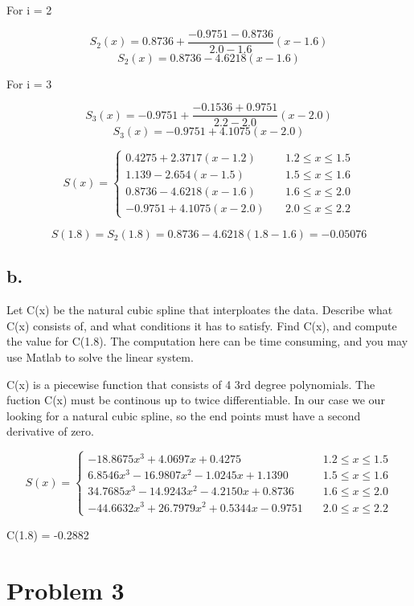 \documentclass[]{article}
\begin{document}
For i = 2

\[S_2(x) = 0.8736 + \frac{-0.9751 - 0.8736}{2.0-1.6}(x-1.6)\]
\[S_2(x) = 0.8736 - 4.6218(x-1.6)\]

For i = 3

\[S_3(x) = -0.9751 + \frac{-0.1536 + 0.9751}{2.2-2.0}(x-2.0)\]
\[S_3(x) = -0.9751 + 4.1075(x-2.0)\]

\[
S(x) = \left\{
        \begin{array}{ll}
            0.4275 + 2.3717(x-1.2) & \quad 1.2 \leq x \leq 1.5 \\
            1.139 - 2.654(x-1.5) & \quad 1.5 \leq x \leq 1.6 \\
            0.8736 - 4.6218(x-1.6) & \quad 1.6 \leq x \leq 2.0\\
            -0.9751 + 4.1075(x-2.0) & \quad 2.0 \leq x \leq 2.2
        \end{array}
    \right.
\]

\[S(1.8) = S_2(1.8) = 0.8736 - 4.6218(1.8 - 1.6) =  -0.05076\]

\subsection{b.}\label{b.}

Let C(x) be the natural cubic spline that interploates the data.
Describe what C(x) consists of, and what conditions it has to satisfy.
Find C(x), and compute the value for C(1.8). The computation here can be
time consuming, and you may use Matlab to solve the linear system.

C(x) is a piecewise function that consists of 4 3rd degree polynomials.
The fuction C(x) must be continous up to twice differentiable. In our
case we our looking for a natural cubic spline, so the end points must
have a second derivative of zero.

\[
S(x) = \left\{
        \begin{array}{ll}
            -18.8675x^3+4.0697x+0.4275 & \quad 1.2 \leq x \leq 1.5 \\
            6.8546x^3-16.9807x^2-1.0245x+1.1390 & \quad 1.5 \leq x \leq 1.6 \\
            34.7685x^3-14.9243x^2-4.2150x+0.8736 & \quad 1.6 \leq x \leq 2.0\\
            -44.6632x^3+26.7979x^2+0.5344x-0.9751 & \quad 2.0 \leq x \leq 2.2
        \end{array}
    \right.
\]

C(1.8) = -0.2882

\section{Problem 3}\label{problem-3}
\end{document}
